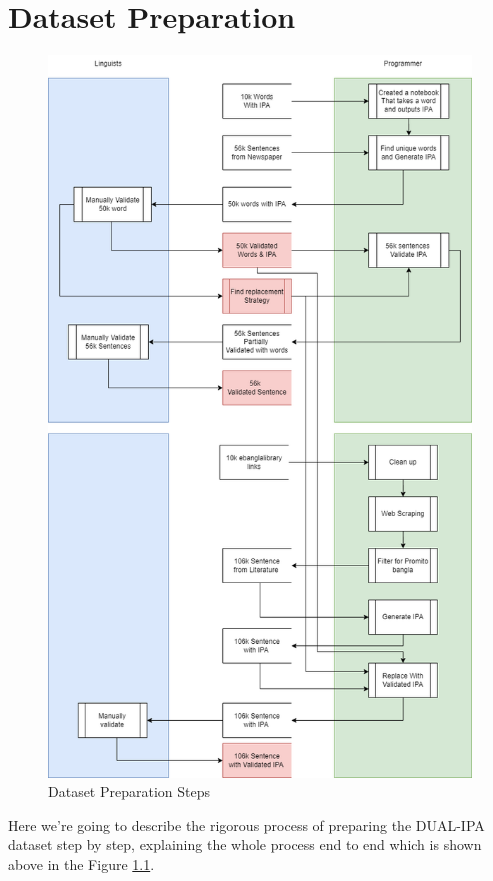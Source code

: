 \chapter{Dataset Preparation}

 \begin{figure}[htbp]
    \centering
    \includegraphics[scale=0.35]{Images/Diagram/preparation.png}
    \caption{Dataset Preparation Steps}
    \label{fig:preparation}
\end{figure} 


Here we're going to describe the rigorous process of preparing the DUAL-IPA dataset step by step, explaining the whole process end to end which is shown above in the Figure \ref{fig:preparation}.
